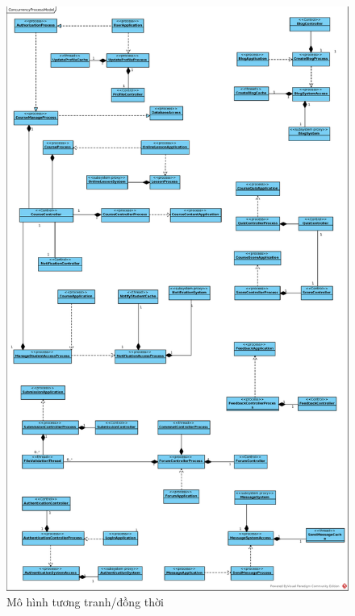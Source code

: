 \documentclass[./../main.tex]{subfiles}
\begin{document}
	\begin{figure}[H]
		\centering
		\includegraphics[width=0.78\linewidth]{./images/ConcurrencyProcessModel.eps}
\caption{Mô hình tương tranh/đồng thời}
	\end{figure}
\end{document}
